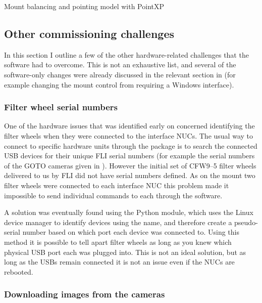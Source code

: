\begin{colsection}
\begin{colsection}
Mount balancing and pointing model with PointXP

\end{colsection}


\newpage
\subsection{Other commissioning challenges}
\label{sec:challenges}
\begin{colsection}

In this section I outline a few of the other hardware-related challenges that the software had to overcome. This is not an exhaustive list, and several of the software-only changes were already discussed in the relevant section in  (for example changing the mount control from requiring a Windows interface).

\subsubsection{Filter wheel serial numbers}

One of the hardware issues that was identified early on concerned identifying the filter wheels when they were connected to the interface NUCs. The usual way to connect to specific hardware units through the  package is to search the connected USB devices for their unique FLI serial numbers (for example the serial numbers of the GOTO cameras given in ). However the initial set of CFW9--5 filter wheels delivered to us by FLI did not have serial numbers defined. As on the mount two filter wheels were connected to each interface NUC this problem made it impossible to send individual commands to each through the software.

A solution was eventually found using the Python  module, which uses the Linux  device manager to identify devices using the  name, and therefore create a pseudo-serial number based on which port each device was connected to. Using this method it is possible to tell apart filter wheels as long as you knew which physical USB port each was plugged into. This is not an ideal solution, but as long as the USBs remain connected it is not an issue even if the NUCs are rebooted.

\subsubsection{Downloading images from the cameras}


\end{colsection}
\end{colsection}
